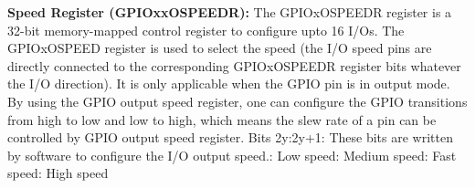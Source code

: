 \documentclass{article}
\begin{document}
\textbf{Speed Register (GPIOx\textunderscore xOSPEEDR): } The GPIOx\textunderscore OSPEEDR register is a 32-bit memory-mapped control register to configure upto 16 I/Os. The GPIOx\textunderscore OSPEED register is used to select the speed (the I/O speed pins are directly connected to the corresponding GPIOx\textunderscore OSPEEDR register bits whatever the I/O direction). It is only applicable when the GPIO pin is in output mode. By using the GPIO output speed register, one can configure the GPIO transitions from high to low and low to high, which means the slew rate of a pin can be controlled by GPIO output speed register.\newline\newline
Bits 2y:2y+1:\newline\newline
These bits are written by software to configure the I/O output speed.\newline{}: Low speed\newline{}: Medium speed\newline{}: Fast speed\newline{}: High speed\newline\newline
\end{document}
